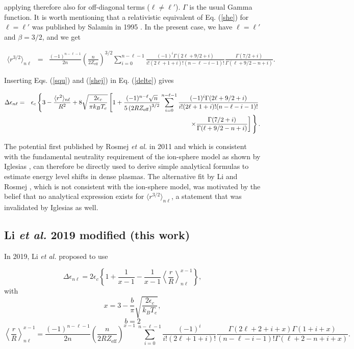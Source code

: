 \documentclass[a4paper,10pt]{article}
\begin{document}
\noindent applying therefore also for off-diagonal terms ($\ell\ne\ell'$). $\Gamma$ is the usual Gamma function. It is worth mentioning that a relativistic equivalent of Eq. (\ref{she}) for $\ell=\ell'$ was published by Salamin in 1995 \cite{SALAMIN95}. In the present case, we have $\ell=\ell'$ and $\beta=3/2$, and we get

\begin{eqnarray}\label{shej}
\langle r^{3/2}\rangle_{n\ell}&=&\frac{(-1)^{n-\ell-1}}{2n}\left(\frac{n}{2Z_{\mathrm{eff}}}\right)^{3/2}\sum_{i=0}^{n-\ell-1}\frac{(-1)^i\Gamma(2\ell+9/2+i)}{i!(2\ell+1+i)!(n-\ell-i-1)!}\frac{\Gamma(7/2+i)}{\Gamma(\ell+9/2-n+i)}.
\end{eqnarray}

Inserting Eqs. (\ref{squ}) and (\ref{shej}) in Eq. (\ref{delte}) gives

\begin{eqnarray}\label{exac}
\Delta\epsilon_{n\ell}&=&\epsilon_c\left\{3-\frac{\langle r^2\rangle_{n\ell}}{R^2}+8\sqrt{\frac{2\epsilon_c}{\pi k_BT_e}}\left[1+\frac{(-1)^{n-\ell}\sqrt{n}}{5\left(2RZ_{\mathrm{eff}}\right)^{3/2}}\sum_{i=0}^{n-\ell-1}\frac{(-1)^i\Gamma(2\ell+9/2+i)}{i!(2\ell+1+i)!(n-\ell-i-1)!}\right.\right.\nonumber\\
& &\left.\left.\times\frac{\Gamma(7/2+i)}{\Gamma(\ell+9/2-n+i)}\right]\vphantom{\sqrt{\frac{Z^*}{\pi Rk_BT_e}}}\right\}.
\end{eqnarray}

\noindent The potential first published by Rosmej \textit{et al.} in 2011 \cite{ROSMEJ11} and which is consistent with the fundamental neutrality requirement of the ion-sphere model as shown by Iglesias \cite{IGLESIAS19a}, can therefore be directly used to derive simple analytical formulas to estimate energy level shifts in dense plasmas. The alternative fit by Li and Rosmej \cite{LI12}, which is not consistent with the ion-sphere model, was motivated by the belief that no analytical expression exists for $\langle r^{3/2}\rangle_{n\ell}$, a statement that was invalidated by Iglesias as well. 

\subsection{Li \textit{et al.} 2019 modified (this work)}\label{subsec43}

In 2019, Li \textit{et al.} \cite{LI19} proposed to use 

\begin{equation}\label{li1924}
\Delta\epsilon_{n\ell}=2\epsilon_c\left\{1+\frac{1}{x-1}-\frac{1}{x-1}\left\langle\frac{r}{R}\right\rangle_{n\ell}^{x-1}\right\},
\end{equation}
\noindent with 
$$ x=3-\frac{b}{\pi}\sqrt{\frac{2\epsilon_c}{k_BT_e}},$$
$$b=2$$
$$\left\langle\frac{r}{R}\right\rangle_{n\ell}^{x-1}=\frac{(-1)^{n-\ell-1}}{2n}\left(\frac{n}{2RZ_{\mathrm{eff}}}\right)^{x-1}~\sum_{i=0}^{n-\ell-1}\frac{(-1)^i}{i!(2\ell+1+i)!}\frac{\Gamma(2\ell+2+i+x)\Gamma(1+i+x)}{(n-\ell-i-1)!\Gamma(\ell+2-n+i+x)}.$$
\end{document}
